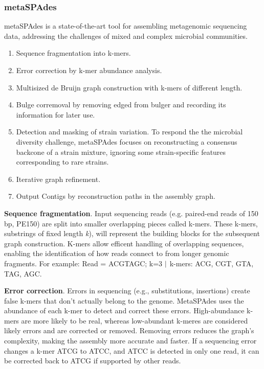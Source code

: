 \subsubsection{metaSPAdes}
metaSPAdes is a state-of-the-art tool for assembling metagenomic sequencing data, addressing the challenges of mixed and 
complex microbial communities.

\begin{enumerate}
    \item Sequence fragmentation into k-mers.
    \item Error correction by k-mer abundance analysis.
    \item Multisized de Bruijn graph construction with k-mers of different length.
    \item Bulge corremoval by removing edged from bulger and recording its information for later use.
    \item Detection and masking of strain variation. To respond the the microbial diversity challenge, metaSPAdes focuses on 
    reconstructing a consensus backcone of a strain mixture, ignoring some strain-specific features corresponding to rare strains.
    \item Iterative graph refinement.
    \item Output Contigs by reconstruction paths in the assembly graph.
\end{enumerate}


\textbf{Sequence fragmentation}. Input sequencing reads (e.g. paired-end reads of 150 bp, PE150) are split into smaller 
overlapping pieces called k-mers. These k-mers, substrings of fixed length \textit{k}), will represent the building blocks for
the subsequent graph construction. K-mers allow efficent handling of overlapping sequences, enabling the identification of 
how reads connect to from longer genomic fragments. For example: Read = ACGTAGC; k=3 $\arrowvert$ k-mers: ACG, CGT, GTA, TAG, AGC.

\textbf{Error correction}. Errors in sequencing (e.g., substitutions, insertions) create false k-mers that don't actually 
belong to the genome. MetaSPAdes uses the abundance of each k-mer to detect and correct these errors. High-abundance k-mers 
are more likely to be real, whereas low-abundant k-meres are considered likely errors and are corrected or removed. Removing 
errors reduces the graph's complexity, making the assembly more accurate and faster. If a sequencing error changes a k-mer 
ATCG to ATCC, and ATCC is detected in only one read, it can be corrected back to ATCG if supported by other reads.

